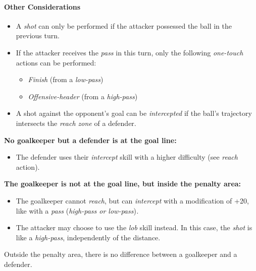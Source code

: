 \documentclass[12pt]{article}
\begin{document}
\paragraph{Other Considerations}

\begin{rulebox}
\begin{itemize}
\item A \emph{shot} can only be performed if the attacker possessed the ball in the previous turn.
\item If the attacker receives the \emph{pass} in this turn, only the following \emph{one-touch} actions can be performed:
\begin{itemize}
\item \emph{Finish} (from a \emph{low-pass})
\item \emph{Offensive-header} (from a \emph{high-pass})
\end{itemize}
\end{itemize}

\begin{itemize}
\item A shot against the opponent's goal can be \emph{intercepted} if the ball's trajectory intersects the \emph{reach zone} of a defender.
\end{itemize}
\end{rulebox}

\begin{specialcase}
\textbf{No goalkeeper but a defender is at the goal line:}
\begin{itemize}
\item The defender uses their \emph{intercept} skill with a higher difficulty (see \emph{reach} action).
\end{itemize}

\textbf{The goalkeeper is not at the goal line, but inside the penalty area:}

\begin{itemize}
\item The goalkeeper cannot \emph{reach}, but can \emph{intercept }with a modification of +20, like with a \emph{pass }(\emph{high-pass or low-pass})\emph{.}
\item The attacker may choose to use the \emph{lob} skill instead. In this case, the \emph{shot} is like a \emph{high-pass}, independently of the distance.
\end{itemize}
\end{specialcase}

\begin{note}
Outside the penalty area, there is no difference between a goalkeeper and a defender.
\end{note}
\end{document}
